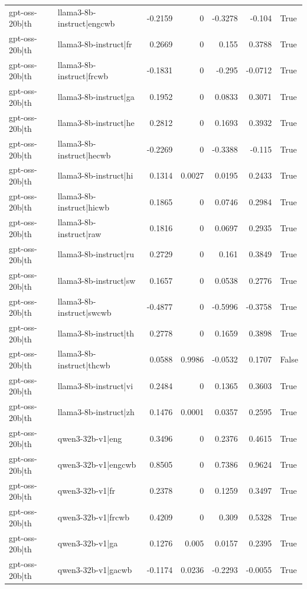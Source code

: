 \begin{table}
\begin{tabular}{l l r r r r l}
gpt-oss-20b|th & llama3-8b-instruct|engcwb & -0.2159 & 0 & -0.3278 & -0.104 & True \\
gpt-oss-20b|th & llama3-8b-instruct|fr & 0.2669 & 0 & 0.155 & 0.3788 & True \\
gpt-oss-20b|th & llama3-8b-instruct|frcwb & -0.1831 & 0 & -0.295 & -0.0712 & True \\
gpt-oss-20b|th & llama3-8b-instruct|ga & 0.1952 & 0 & 0.0833 & 0.3071 & True \\
gpt-oss-20b|th & llama3-8b-instruct|he & 0.2812 & 0 & 0.1693 & 0.3932 & True \\
gpt-oss-20b|th & llama3-8b-instruct|hecwb & -0.2269 & 0 & -0.3388 & -0.115 & True \\
gpt-oss-20b|th & llama3-8b-instruct|hi & 0.1314 & 0.0027 & 0.0195 & 0.2433 & True \\
gpt-oss-20b|th & llama3-8b-instruct|hicwb & 0.1865 & 0 & 0.0746 & 0.2984 & True \\
gpt-oss-20b|th & llama3-8b-instruct|raw & 0.1816 & 0 & 0.0697 & 0.2935 & True \\
gpt-oss-20b|th & llama3-8b-instruct|ru & 0.2729 & 0 & 0.161 & 0.3849 & True \\
gpt-oss-20b|th & llama3-8b-instruct|sw & 0.1657 & 0 & 0.0538 & 0.2776 & True \\
gpt-oss-20b|th & llama3-8b-instruct|swcwb & -0.4877 & 0 & -0.5996 & -0.3758 & True \\
gpt-oss-20b|th & llama3-8b-instruct|th & 0.2778 & 0 & 0.1659 & 0.3898 & True \\
gpt-oss-20b|th & llama3-8b-instruct|thcwb & 0.0588 & 0.9986 & -0.0532 & 0.1707 & False \\
gpt-oss-20b|th & llama3-8b-instruct|vi & 0.2484 & 0 & 0.1365 & 0.3603 & True \\
gpt-oss-20b|th & llama3-8b-instruct|zh & 0.1476 & 0.0001 & 0.0357 & 0.2595 & True \\
gpt-oss-20b|th & qwen3-32b-v1|eng & 0.3496 & 0 & 0.2376 & 0.4615 & True \\
gpt-oss-20b|th & qwen3-32b-v1|engcwb & 0.8505 & 0 & 0.7386 & 0.9624 & True \\
gpt-oss-20b|th & qwen3-32b-v1|fr & 0.2378 & 0 & 0.1259 & 0.3497 & True \\
gpt-oss-20b|th & qwen3-32b-v1|frcwb & 0.4209 & 0 & 0.309 & 0.5328 & True \\
gpt-oss-20b|th & qwen3-32b-v1|ga & 0.1276 & 0.005 & 0.0157 & 0.2395 & True \\
gpt-oss-20b|th & qwen3-32b-v1|gacwb & -0.1174 & 0.0236 & -0.2293 & -0.0055 & True \\

\end{tabular}
\end{table}
